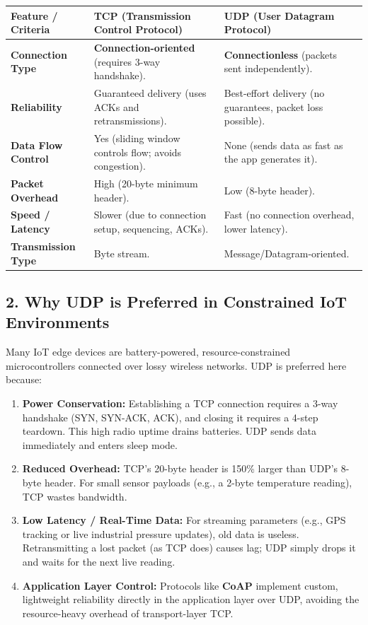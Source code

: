 \begin{table}[H]
\centering
\begin{tabular}{|p{}|p{}|p{}|}
\hline
Feature / Criteria & TCP (Transmission Control Protocol) & UDP (User Datagram Protocol) \\
\hline
\textbf{Connection Type} & \textbf{Connection-oriented} (requires 3-way handshake). & \textbf{Connectionless} (packets sent independently). \\
\hline
\textbf{Reliability} & Guaranteed delivery (uses ACKs and retransmissions). & Best-effort delivery (no guarantees, packet loss possible). \\
\hline
\textbf{Data Flow Control} & Yes (sliding window controls flow; avoids congestion). & None (sends data as fast as the app generates it). \\
\hline
\textbf{Packet Overhead} & High (20-byte minimum header). & Low (8-byte header). \\
\hline
\textbf{Speed / Latency} & Slower (due to connection setup, sequencing, ACKs). & Fast (no connection overhead, lower latency). \\
\hline
\textbf{Transmission Type} & Byte stream. & Message/Datagram-oriented. \\
\hline
\end{tabular}
\end{table}


\subsection{2. Why UDP is Preferred in Constrained IoT Environments}
Many IoT edge devices are battery-powered, resource-constrained microcontrollers connected over lossy wireless networks. UDP is preferred here because:
\begin{enumerate}
  \item \textbf{Power Conservation:} Establishing a TCP connection requires a 3-way handshake (SYN, SYN-ACK, ACK), and closing it requires a 4-step teardown. This high radio uptime drains batteries. UDP sends data immediately and enters sleep mode.
  \item \textbf{Reduced Overhead:} TCP's 20-byte header is 150\% larger than UDP's 8-byte header. For small sensor payloads (e.g., a 2-byte temperature reading), TCP wastes bandwidth.
  \item \textbf{Low Latency / Real-Time Data:} For streaming parameters (e.g., GPS tracking or live industrial pressure updates), old data is useless. Retransmitting a lost packet (as TCP does) causes lag; UDP simply drops it and waits for the next live reading.
  \item \textbf{Application Layer Control:} Protocols like \textbf{CoAP} implement custom, lightweight reliability directly in the application layer over UDP, avoiding the resource-heavy overhead of transport-layer TCP.
\end{enumerate}


